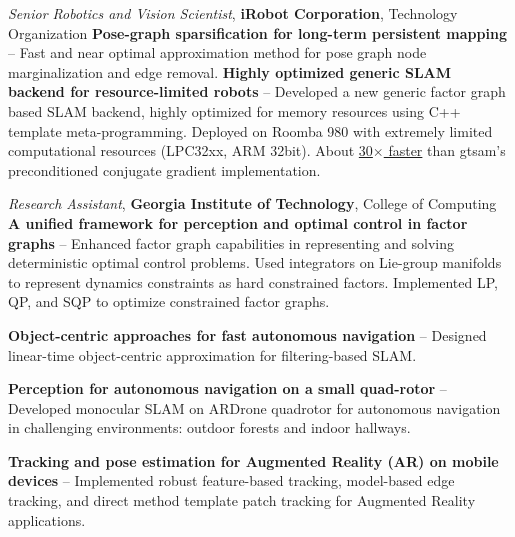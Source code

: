 \documentclass[letterpaper,MMMyyyy,nonstopmode]{simpleresumecv}
\begin{document}
\begin{Body}
\BigGap
\Entry
{\textit{Senior Robotics and Vision Scientist}, \textbf{iRobot Corporation}, Technology Organization}
\Gap
\BulletItem
\textbf{Pose-graph sparsification for long-term persistent mapping}
\hfill
{} -- 
\SubBulletItem
Fast and near optimal approximation method for pose graph node marginalization and edge removal.
\Gap
\BulletItem
\textbf{Highly optimized generic SLAM backend for resource-limited robots}
\hfill
{} -- 
\SubBulletItem
Developed a new generic factor graph based SLAM backend, highly optimized for memory resources using C++ template meta-programming.
\SubBulletItem
Deployed on Roomba 980 with extremely limited computational resources (LPC32xx, ARM 32bit). 
\SubBulletItem
About \underline{30$\times$ faster} than gtsam's preconditioned conjugate gradient implementation.

\BigGap
\Entry
{\textit{Research Assistant}, \textbf{Georgia Institute of Technology}, College of Computing}
\Gap
\BulletItem
\textbf{A unified framework for perception and optimal control in factor graphs}
\hfill
{} -- 
\SubBulletItem
Enhanced factor graph capabilities in representing and solving deterministic optimal control problems. 
\SubBulletItem
Used integrators on Lie-group manifolds to represent dynamics constraints as hard constrained factors.
\SubBulletItem
Implemented LP, QP, and SQP to optimize constrained factor graphs.

\Gap
\BulletItem
\textbf{Object-centric approaches for fast autonomous navigation}
\hfill
{} -- 
\SubBulletItem
Designed linear-time object-centric approximation for filtering-based SLAM. 

\Gap
\BulletItem
\textbf{Perception for autonomous navigation on a small quad-rotor}
\hfill
{} -- 
\SubBulletItem
Developed monocular SLAM on ARDrone quadrotor for autonomous navigation in challenging environments: outdoor forests and indoor hallways.

\Gap
\BulletItem
\textbf{Tracking and pose estimation for Augmented Reality (AR) on mobile devices}
\hfill
{} -- 
\SubBulletItem
Implemented robust feature-based tracking, model-based edge tracking, and direct method template patch tracking for Augmented Reality applications.


\end{Body}
\end{document}
